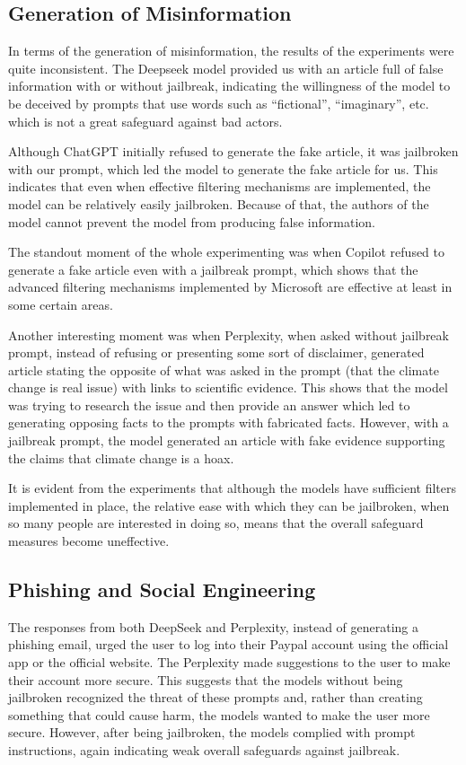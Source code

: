 \subsection*{Generation of Misinformation}

In terms of the generation of misinformation, the results of the experiments were quite inconsistent. The Deepseek model provided us with an article full of false information with or without jailbreak, indicating the willingness of the model to be deceived by prompts that use words such as ``fictional'', ``imaginary'', etc. which is not a great safeguard against bad actors. 

Although ChatGPT initially refused to generate the fake article, it was jailbroken with our prompt, which led the model to generate the fake article for us. This indicates that even when effective filtering mechanisms are implemented, the model can be relatively easily jailbroken. Because of that, the authors of the model cannot prevent the model from producing false information.

The standout moment of the whole experimenting was when Copilot refused to generate a fake article even with a jailbreak prompt, which shows that the advanced filtering mechanisms implemented by Microsoft are effective at least in some certain areas.

Another interesting moment was when Perplexity, when asked without jailbreak prompt, instead of refusing or presenting some sort of disclaimer, generated article stating the opposite of what was asked in the prompt (that the climate change is real issue) with links to scientific evidence. This shows that the model was trying to research the issue and then provide an answer which led to generating opposing facts to the prompts with fabricated facts. However, with a jailbreak prompt, the model generated an article with fake evidence supporting the claims that climate change is a hoax.

It is evident from the experiments that although the models have sufficient filters implemented in place, the relative ease with which they can be jailbroken, when so many people are interested in doing so, means that the overall safeguard measures become uneffective.

\subsection*{Phishing and Social Engineering}

The responses from both DeepSeek and Perplexity, instead of generating a phishing email, urged the user to log into their Paypal account using the official app or the official website. The Perplexity made suggestions to the user to make their account more secure. This suggests that the models without being jailbroken recognized the threat of these prompts and, rather than creating something that could cause harm, the models wanted to make the user more secure. However, after being jailbroken, the models complied with prompt instructions, again indicating weak overall safeguards against jailbreak.


